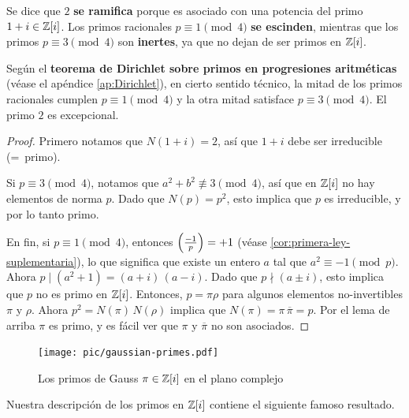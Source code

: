 Se dice que $2$ \textbf{se ramifica} porque es asociado con una potencia del
primo $1+i \in \mathbb{Z} [i]$. Los primos racionales $p \equiv 1 \pmod{4}$
\textbf{se escinden}, mientras que los primos $p \equiv 3 \pmod{4}$ son
\textbf{inertes}, ya que no dejan de ser primos en $\mathbb{Z} [i]$.

Según el
\textbf{teorema de Dirichlet sobre primos en progresiones aritméticas}
(véase el apéndice \ref{ap:Dirichlet}), en cierto sentido técnico, la mitad de
los primos racionales cumplen $p \equiv 1 \pmod{4}$ y la otra mitad satisface
$p \equiv 3 \pmod{4}$. El primo $2$ es excepcional.

\begin{proof}
  Primero notamos que $N (1+i) = 2$, así que $1 + i$ debe ser irreducible
  (=~primo).
 
  Si $p \equiv 3 \pmod{4}$, notamos que $a^2 + b^2 \not\equiv 3 \pmod{4}$, así
  que en $\mathbb{Z} [i]$ no hay elementos de norma $p$. Dado que $N (p) = p^2$, esto
  implica que $p$ es irreducible, y por lo tanto primo.

  En fin, si $p \equiv 1 \pmod{4}$, entonces $\left(\frac{-1}{p}\right) = +1$ (véase
  \ref{cor:primera-ley-suplementaria}), lo que significa que existe un entero
  $a$ tal que $a^2 \equiv -1 \pmod{p}$. Ahora
  $p \mid (a^2 + 1) = (a + i)\,(a - i)$. Dado que $p \nmid (a \pm i)$, esto
  implica que $p$ no es primo en $\mathbb{Z} [i]$. Entonces, $p = \pi\rho$ para algunos
  elementos no-invertibles $\pi$ y $\rho$.  Ahora $p^2 = N (\pi) \, N (\rho)$
  implica que $N (\pi) = \pi\,\overline{\pi} = p$. Por el lema de arriba $\pi$
  es primo, y es fácil ver que $\pi$ y $\overline{\pi}$ no son asociados.
\end{proof}

\begin{figure}
  \begin{center}
    \texttt{[image: pic/gaussian-primes.pdf]}
  \end{center}

  \caption{Los primos de Gauss $\pi \in \mathbb{Z} [i]$ en el plano complejo}
\end{figure}

Nuestra descripción de los primos en $\mathbb{Z} [i]$ contiene el siguiente famoso
resultado.


